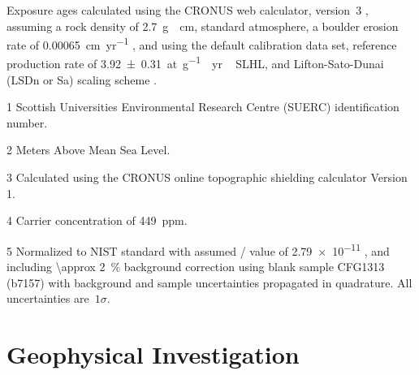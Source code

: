 \documentclass[utf8]{frontiersSCNS}
\begin{document}
\begin{table}
\begin{threeparttable}
  \begin{tablenotes}
    \footnotesize
  \item[]
    \hspace*{-0.2cm}
    Exposure ages calculated using the CRONUS web calculator, version~3 \citep[][\url{https://hess.ess.washington.edu}; version info -- wrapper: 3.0.2, get\_age: 3.0.2, muons: 1A, alpha = 1, validate: validate\_v2\_input.m - 3.0, const:3.0.4]{Balco+2008}, assuming a rock density of \SI{2.7}{g \per cm}, standard atmosphere, a boulder erosion rate of \SI{0.00065}{cm\per yr} \citep{wahrhaftig2019extent}, and using the default calibration data set, reference production rate of \SI{3.92 \pm 0.31}{at\per g \per yr \, SLHL}, and Lifton-Sato-Dunai (LSDn or Sa) scaling scheme \citep{lifton2014scaling,phillips2016cronus}.
  \item[1]
    Scottish Universities Environmental Research Centre (SUERC) identification number.  
  \item[2]
    Meters Above Mean Sea Level.
  \item[3]
    Calculated using the CRONUS online topographic shielding calculator Version 1.
  \item[4]
    Carrier  concentration of \SI{449}{ppm}.
  \item[5]
    Normalized to NIST standard with assumed / value of \num{2.79e-11} \citep{Nishiizumi+2007}, and including \SI{\approx 2}{\%} background correction using blank sample CFG1313 (b7157) with background and sample uncertainties propagated in quadrature. All uncertainties are~$1\sigma$. 
  \end{tablenotes}
\end{threeparttable}
\end{table}
 
\section{Geophysical Investigation}\label{sec:geophys}
\end{document}
